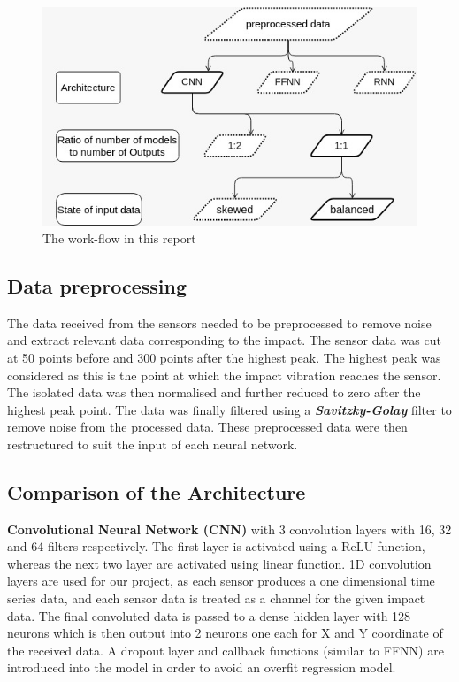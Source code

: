 \documentclass[12pt]{article}
\begin{document}
\begin{figure}[h!]
\begin{center}
\includegraphics[scale=0.6]{Images/Flowchart.jpeg}
\caption{The work-flow in this report}
\label{flowchart}
\end{center}
\end{figure}
\par

\subsection{Data preprocessing} The data received from the sensors needed to be preprocessed to remove noise and extract relevant data corresponding to the impact. The sensor data was cut at 50 points before and 300 points after the highest peak. The highest peak was considered as this is the point at which the impact vibration reaches the sensor. The isolated data was then normalised and further reduced to zero after the highest peak point. The data was finally filtered using a \emph{\textbf{Savitzky-Golay}} filter to remove noise from the processed data. These preprocessed data were then restructured to suit the input of each neural network.     

\subsection{Comparison of the Architecture}
\par
\textbf{Convolutional Neural Network (CNN)} with 3 convolution layers with 16, 32 and 64 filters respectively. The first layer is activated using a ReLU function, whereas the next two layer are activated using linear function. 1D convolution layers are used for our project, as each sensor produces a one dimensional time series data, and each sensor data is treated as a channel for the given impact data. The final convoluted data is passed to a dense hidden layer with 128 neurons which is then output into 2 neurons one each for X and Y coordinate of the received data. A dropout layer and callback functions (similar to FFNN) are introduced into the model in order to avoid an overfit regression model. 
\end{document}
